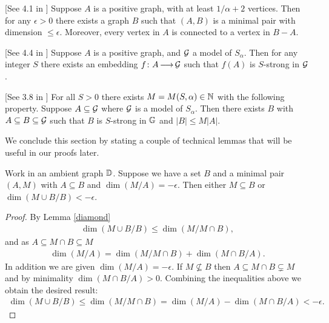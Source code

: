 \begin{Lemma} \label{las_min} [See 4.1 in \cite{laskowski}]
  Suppose $A$ is a positive graph, with at least $1/\alpha + 2$ vertices.
  Then for any $\epsilon > 0$ there exists a graph $B$ such that $(A, B)$ is a minimal pair with dimension $\leq \epsilon$.
  Moreover, every vertex in $A$ is connected to a vertex in $B - A$.
\end{Lemma}

\begin{Lemma} \label{las_str} [See 4.4 in \cite{laskowski}]
  Suppose $A$ is a positive graph, and $\mathcal G$ a model of $S_\alpha$.
  Then for any integer $S$ there exists an embedding $f \colon A \operatorname{\longrightarrow} \mathcal G$ such that $f(A)$ is $S$-strong in $\mathcal G$.
\end{Lemma}
    
\begin{Lemma} \label{las_closure} [See 3.8 in \cite{laskowski}]
  For all $S > 0$ there exists $M = M(S, \alpha) \in \mathbb{N}$ with the following property.
  Suppose $A \subseteq \mathcal G$ where $\mathcal G$ is a model of $S_\alpha$.
  Then there exists $B$ with $A \subseteq B \subseteq \mathcal G$ such that $B$ is $S$-strong in $\mathbb G$ and $|B| \leq M|A|$.
\end{Lemma}

We conclude this section by stating a couple of technical lemmas that will be useful in our proofs later.

\begin{Lemma} \label{minimal_over_set}
  Work in an ambient graph $\mathbb D$.
  Suppose we have a set $B$ and a minimal pair $(A, M)$ with $A \subseteq B$ and $\dim(M/A) = -\epsilon$.
  Then either $M \subseteq B$ or $\dim(M \cup B/B) < -\epsilon$.
\end{Lemma}

\begin{proof}
  By Lemma \ref{diamond}
  \begin{align*}
    \dim(M \cup B/B) \leq \dim(M / M \cap B),
  \end{align*}
  and as $A \subseteq M \cap B \subseteq M$
  \begin{align*}
    \dim (M/A) = \dim(M / M \cap B) + \dim(M \cap B / A).
  \end{align*}
  In addition we are given $\dim (M/A) = -\epsilon$.
  If $M \not\subseteq B$ then $A \subseteq M \cap B \subsetneq M$ and by minimality $\dim(M \cap B / A) > 0$.
  Combining the inequalities above we obtain the desired result:
  \begin{align*}
    \dim(M \cup B/B) \leq \dim(M / M \cap B) = \dim (M/A) - \dim(M \cap B / A) < -\epsilon.
  \end{align*}
\end{proof}

